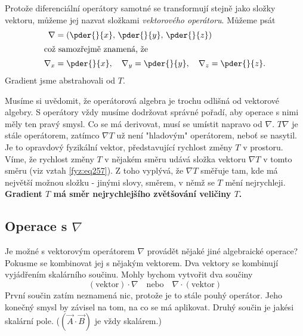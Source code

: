     Protože diferenciální operátory samotné se transformují stejně jako složky vektoru, můžeme jej 
    nazvat složkami \emph{vektorového operátoru}. Můžeme psát
    \begin{align}
      \nabla   &= \left(\pder{ }{x},\,\pder{ }{y},\,\pder{ }{z}\right)       \label{fyz:eq258}\\
      \shortintertext{což samozřejmě znamená, že}
      \nabla_x &= \pder{ }{x},\quad \nabla_y=\pder{ }{y},\quad\nabla_z=\pder{ }{z}.
    \end{align}  
    Gradient jsme abstrahovali od \(T\).

    Musíme si uvědomit, že operátorová algebra je trochu odlišná od vektorové algebry. S operátory 
    vždy musíme dodržovat správné pořadí, aby operace s nimi měly ten pravý smysl. Co se má 
    derivovat, musí se umístit napravo od $\nabla$. $T\nabla$ je stále operátorem, zatímco $\nabla 
    T$ už není "hladovým" operátorem, neboť se nasytil. Je to opravdový fyzikální vektor, 
    představující rychlost změny $T$ v prostoru. Víme, že rychlost změny $T$ v nějakém směru udává 
    složka vektoru $\nabla T$ v tomto směru (viz vztah \ref{fyz:eq257}). Z toho vyplývá, že 
    $\nabla T$ směřuje tam, kde má největší možnou složku - jinými slovy, směrem, v němž se $T$ 
    mění nejrychleji. \textbf{Gradient $T$ má směr nej\-rychlejšího zvětšo\-vání veličiny $T$.}
    
    \subsection{Operace s \texorpdfstring{\(\nabla\)}{nabla}}
      Je možné s vektorovým operátorem $\nabla$ provádět nějaké jiné algebraické operace? Pokusme 
      se kombinovat jej s nějakým vektorem. Dva vektory se kombinují vy\-já\-dře\-ním skalárního 
      součinu. Mohly bychom vytvořit dva součiny
      \begin{equation}\label{fyz:eq259}
        (\mathrm{vektor})\cdot\nabla\quad\mathrm{nebo}\quad\nabla\cdot(\mathrm{vektor})
      \end{equation}
      První součin zatím neznamená nic, protože je to stále pouhý operátor. Jeho konečný smysl by 
      závisel na tom, na co se má aplikovat. Druhý součin je jakési skalární pole. 
      ($(\vec{A}\cdot\vec{B})$ je vždy skalárem.)

